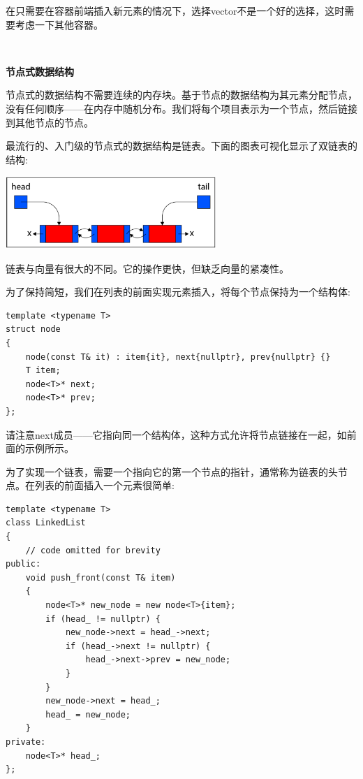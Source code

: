 在只需要在容器前端插入新元素的情况下，选择vector不是一个好的选择，这时需要考虑一下其他容器。 \par

\noindent\textbf{}\ \par
\textbf{节点式数据结构} \ \par
节点式的数据结构不需要连续的内存块。基于节点的数据结构为其元素分配节点，没有任何顺序——在内存中随机分布。我们将每个项目表示为一个节点，然后链接到其他节点的节点。 \par
最流行的、入门级的节点式的数据结构是链表。下面的图表可视化显示了双链表的结构: \par

\begin{center}
	\includegraphics[width=0.6\textwidth]{content/Section-2/Chapter-6/5}
\end{center}

链表与向量有很大的不同。它的操作更快，但缺乏向量的紧凑性。 \par
为了保持简短，我们在列表的前面实现元素插入，将每个节点保持为一个结构体: \par

\begin{lstlisting}[caption={}]
template <typename T>
struct node
{
	node(const T& it) : item{it}, next{nullptr}, prev{nullptr} {}
	T item;
	node<T>* next;
	node<T>* prev;
};
\end{lstlisting}

请注意next成员——它指向同一个结构体，这种方式允许将节点链接在一起，如前面的示例所示。 \par
为了实现一个链表，需要一个指向它的第一个节点的指针，通常称为链表的头节点。在列表的前面插入一个元素很简单: \par

\begin{lstlisting}[caption={}]
template <typename T>
class LinkedList
{
	// code omitted for brevity
public:
	void push_front(const T& item)
	{
		node<T>* new_node = new node<T>{item};
		if (head_ != nullptr) {
			new_node->next = head_->next;
			if (head_->next != nullptr) {
				head_->next->prev = new_node;
			}
		}
		new_node->next = head_;
		head_ = new_node;
	}
private:
	node<T>* head_;
};
\end{lstlisting}

